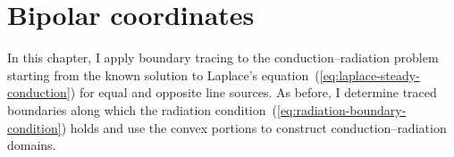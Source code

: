 \chapter{Bipolar coordinates}
\label{ch:bipolar}

In this chapter,
I apply boundary tracing to the conduction--radiation problem
starting from the known solution
to Laplace's equation~(\ref{eq:laplace-steady-conduction})
for equal and opposite line sources.
As before,
I determine traced boundaries along which
the radiation condition~(\ref{eq:radiation-boundary-condition}) holds
and use the convex portions to construct conduction--radiation domains.
